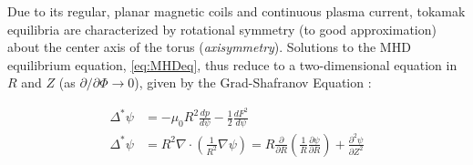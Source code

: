 \begin{figure}[t]
 \pushtooutside
\end{figure}

Due to its regular, planar magnetic coils and continuous plasma current, tokamak equilibria are characterized by rotational symmetry (to good approximation) about the center axis of the torus (\emph{axisymmetry}).  Solutions to the MHD equilibrium equation, \cref{eq:MHDeq}, thus reduce to a two-dimensional equation in $R$ and $Z$ (as $\partial/\partial \Phi \rightarrow 0$), given by the Grad-Shafranov Equation \cite{Grad1958,Shafranov1960,Freidberg1987}:

\begin{equation}\label{eq:gradshafranov}
 \begin{aligned}
 \Delta^* \psi &= -\mu_0 R^2 \frac{dp}{d\psi} - \frac{1}{2} \frac{dF^2}{d\psi}\\
 \Delta^* \psi &= R^2 \nabla \cdot \left(\frac{1}{R^2} \nabla \psi \right) = R \frac{\partial}{\partial R} \left(\frac{1}{R} \frac{\partial \psi}{\partial R} \right) + \frac{\partial^2 \psi}{\partial Z^2}
 \end{aligned}
\end{equation}

